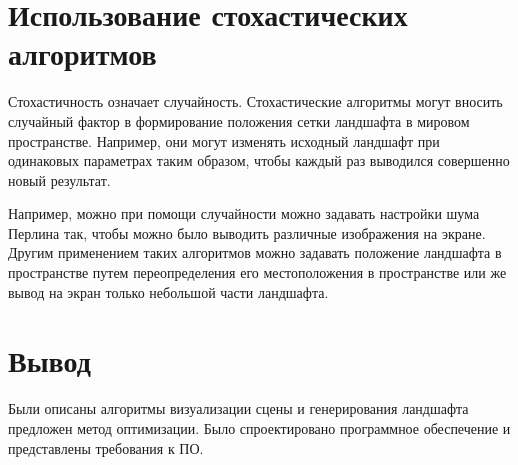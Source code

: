 \section{Использование стохастических алгоритмов}
Стохастичность означает случайность. Стохастические алгоритмы могут вносить случайный фактор в формирование положения сетки ландшафта в мировом пространстве. Например, они могут изменять исходный ландшафт при одинаковых параметрах таким образом, чтобы каждый раз выводился совершенно новый результат.

Например, можно при помощи случайности можно задавать настройки шума Перлина так, чтобы можно было выводить различные изображения на экране. Другим применением таких алгоритмов можно задавать положение ландшафта в пространстве путем переопределения его местоположения в пространстве или же вывод на экран только небольшой части ландшафта.

\section{Вывод}
Были описаны алгоритмы визуализации сцены и генерирования ландшафта предложен метод оптимизации. Было спроектировано программное обеспечение и представлены требования к ПО.